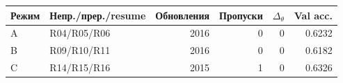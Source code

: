 \begin{tabular}{llrrrr}
\toprule
Режим & Непр./прер./resume & Обновления & Пропуски & $\Delta_\theta$ & Val acc. \\
\midrule
A & R04/R05/R06 & 2016 & 0 & 0 & 0.6232 \\
B & R09/R10/R11 & 2016 & 0 & 0 & 0.6182 \\
C & R14/R15/R16 & 2015 & 1 & 0 & 0.6326 \\
\bottomrule
\end{tabular}
